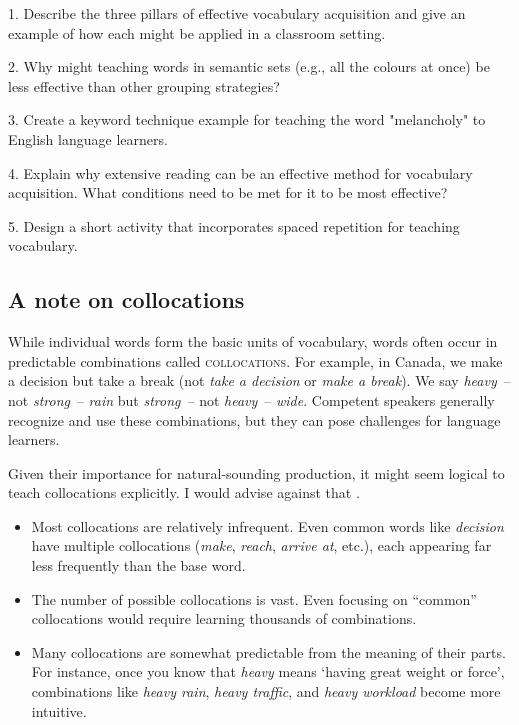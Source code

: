 \begin{tcolorbox}[title=Exercise: Teaching and Learning Vocabulary, colback=white, colframe=orange!75!black, fonttitle=\bfseries]
1. Describe the three pillars of effective vocabulary acquisition and give an example of how each might be applied in a classroom setting.

2. Why might teaching words in semantic sets (e.g., all the colours at once) be less effective than other grouping strategies?

3. Create a keyword technique example for teaching the word "melancholy" to English language learners.

4. Explain why extensive reading can be an effective method for vocabulary acquisition. What conditions need to be met for it to be most effective?

5. Design a short activity that incorporates spaced repetition for teaching vocabulary.
\end{tcolorbox}

\subsection{A note on collocations}\label{sec:collocations}

While individual words form the basic units of vocabulary, words often occur in predictable combinations called \textsc{collocations}. For example, in Canada, we make a decision but take a break (not \textit{take a decision} or \textit{make a break}). We say \textit{heavy}~-- not \textit{strong}~-- \textit{rain} but \textit{strong}~-- not \textit{heavy}~-- \textit{wide}. Competent speakers generally recognize and use these combinations, but they can pose challenges for language learners.

Given their importance for natural-sounding production, it might seem logical to teach collocations explicitly. I would advise against that \citep{reynolds2019against}.

\begin{itemize}
    \item Most collocations are relatively infrequent. Even common words like \textit{decision} have multiple collocations (\textit{make}, \textit{reach}, \textit{arrive at}, etc.), each appearing far less frequently than the base word.
    
    \item The number of possible collocations is vast. Even focusing on ``common'' collocations would require learning thousands of combinations.
    
    \item Many collocations are somewhat predictable from the meaning of their parts. For instance, once you know that \textit{heavy} means `having great weight or force', combinations like \textit{heavy rain}, \textit{heavy traffic}, and \textit{heavy workload} become more intuitive.
\end{itemize}

